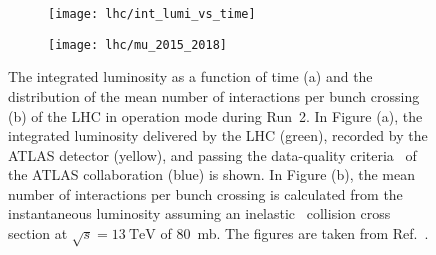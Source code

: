 
\begin{figure}[htbp]
  \centering

  \begin{subfigure}{0.47\textwidth}
    \texttt{[image: lhc/int\_lumi\_vs\_time]}
    \subcaption{}%
    \label{fig:atlas_int_lumi_vs_time}
  \end{subfigure}\hspace*{0.02\textwidth}%
  \begin{subfigure}{0.47\textwidth}
    \texttt{[image: lhc/mu\_2015\_2018]}
    \subcaption{}%
    \label{fig:atlas_mu}
  \end{subfigure}

  \caption[The integrated luminosity and the mean number of interactions per
  bunch crossing at the ATLAS experiment during Run~2 of the LHC.]{The
    integrated luminosity as a function of time (a) and the distribution of the
    mean number of interactions per bunch crossing (b) of the LHC in \pp
    operation mode during Run~2. In Figure (a), the integrated luminosity
    delivered by the LHC (green), recorded by the ATLAS detector (yellow), and
    passing the data-quality criteria~\cite{DAPR-2018-01} of the ATLAS
    collaboration (blue) is shown. In Figure (b), the mean number of
    interactions per bunch crossing is calculated from the instantaneous
    luminosity assuming an inelastic \pp~collision cross section at
    $\sqrt{s} = \SI{13}{\TeV}$ of \SI{80}{\milli\barn}. The figures are taken
    from Ref.~\cite{atlas_luminosity_summary_plots}.}%
  \label{fig:lumi_and_pu}
\end{figure}

